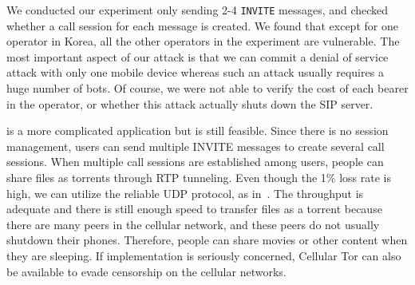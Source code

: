 We conducted our experiment only sending 2-4 {\tt INVITE} messages,
and checked whether a call session for each message is created. We found that except for one operator in Korea, all the other
operators in the experiment are vulnerable. The most important aspect of
 our attack is that we can commit a denial of service attack with only
one mobile device whereas such an attack usually requires a
huge number of bots. Of course, we were not able to verify the
cost of each bearer in the operator, or whether this attack actually
shuts down the SIP server.




 is a more complicated application but is still feasible.
Since there is no session management, users can send multiple INVITE messages to create several call sessions.
When multiple call sessions are established among users, people can share files as torrents through RTP tunneling.
Even though the 1\% loss rate is high, we can utilize the reliable UDP protocol, as in~\cite{bova1999reliable}. The throughput
is adequate and there is still enough speed to transfer files as a torrent because there are many peers in the cellular network, and these peers do not usually shutdown their phones. Therefore, people can share movies or other content when they are sleeping.
If implementation is seriously concerned, Cellular Tor can also be available to evade censorship on the cellular networks.

